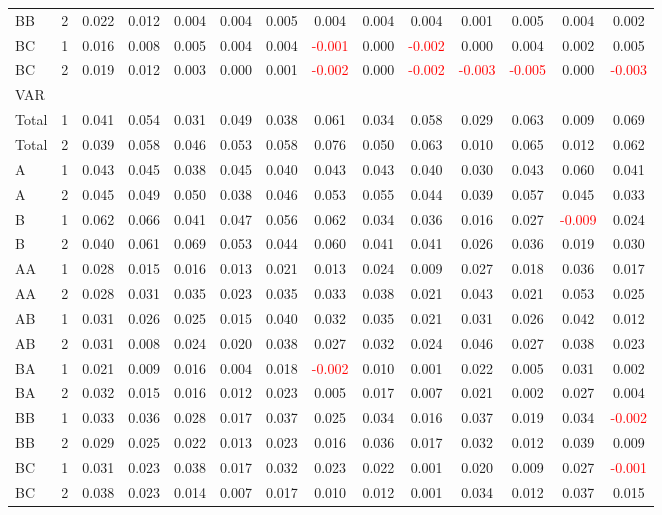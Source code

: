 \begin{table}[H]
{\begin{tabular}{llcccccccccccc}
BB & 2 & 0.022 & 0.012 & 0.004 & 0.004 & 0.005 & 0.004 & 0.004 & 0.004 & 0.001 & 0.005 & 0.004 & 0.002\\
BC & 1 & 0.016 & 0.008 & 0.005 & 0.004 & 0.004 & \textcolor{red}{-0.001} & 0.000 & \textcolor{red}{-0.002} & 0.000 & 0.004 & 0.002 & 0.005\\
BC & 2 & 0.019 & 0.012 & 0.003 & 0.000 & 0.001 & \textcolor{red}{-0.002} & 0.000 & \textcolor{red}{-0.002} & \textcolor{red}{-0.003} & \textcolor{red}{-0.005} & 0.000 & \textcolor{red}{-0.003}\\
\hline
VAR &  &  &  &  &  &  &  &  &  &  &  &  & \\
\hline
Total & 1 & 0.041 & 0.054 & 0.031 & 0.049 & 0.038 & 0.061 & 0.034 & 0.058 & 0.029 & 0.063 & 0.009 & 0.069\\
Total & 2 & 0.039 & 0.058 & 0.046 & 0.053 & 0.058 & 0.076 & 0.050 & 0.063 & 0.010 & 0.065 & 0.012 & 0.062\\
A & 1 & 0.043 & 0.045 & 0.038 & 0.045 & 0.040 & 0.043 & 0.043 & 0.040 & 0.030 & 0.043 & 0.060 & 0.041\\
A & 2 & 0.045 & 0.049 & 0.050 & 0.038 & 0.046 & 0.053 & 0.055 & 0.044 & 0.039 & 0.057 & 0.045 & 0.033\\
B & 1 & 0.062 & 0.066 & 0.041 & 0.047 & 0.056 & 0.062 & 0.034 & 0.036 & 0.016 & 0.027 & \textcolor{red}{-0.009} & 0.024\\
B & 2 & 0.040 & 0.061 & 0.069 & 0.053 & 0.044 & 0.060 & 0.041 & 0.041 & 0.026 & 0.036 & 0.019 & 0.030\\
AA & 1 & 0.028 & 0.015 & 0.016 & 0.013 & 0.021 & 0.013 & 0.024 & 0.009 & 0.027 & 0.018 & 0.036 & 0.017\\
AA & 2 & 0.028 & 0.031 & 0.035 & 0.023 & 0.035 & 0.033 & 0.038 & 0.021 & 0.043 & 0.021 & 0.053 & 0.025\\
AB & 1 & 0.031 & 0.026 & 0.025 & 0.015 & 0.040 & 0.032 & 0.035 & 0.021 & 0.031 & 0.026 & 0.042 & 0.012\\
AB & 2 & 0.031 & 0.008 & 0.024 & 0.020 & 0.038 & 0.027 & 0.032 & 0.024 & 0.046 & 0.027 & 0.038 & 0.023\\
BA & 1 & 0.021 & 0.009 & 0.016 & 0.004 & 0.018 & \textcolor{red}{-0.002} & 0.010 & 0.001 & 0.022 & 0.005 & 0.031 & 0.002\\
BA & 2 & 0.032 & 0.015 & 0.016 & 0.012 & 0.023 & 0.005 & 0.017 & 0.007 & 0.021 & 0.002 & 0.027 & 0.004\\
BB & 1 & 0.033 & 0.036 & 0.028 & 0.017 & 0.037 & 0.025 & 0.034 & 0.016 & 0.037 & 0.019 & 0.034 & \textcolor{red}{-0.002}\\
BB & 2 & 0.029 & 0.025 & 0.022 & 0.013 & 0.023 & 0.016 & 0.036 & 0.017 & 0.032 & 0.012 & 0.039 & 0.009\\
BC & 1 & 0.031 & 0.023 & 0.038 & 0.017 & 0.032 & 0.023 & 0.022 & 0.001 & 0.020 & 0.009 & 0.027 & \textcolor{red}{-0.001}\\
BC & 2 & 0.038 & 0.023 & 0.014 & 0.007 & 0.017 & 0.010 & 0.012 & 0.001 & 0.034 & 0.012 & 0.037 & 0.015\\
\hline
    \end{tabular}%
    }
    \label{tab:cen5_sh}
\end{table}


